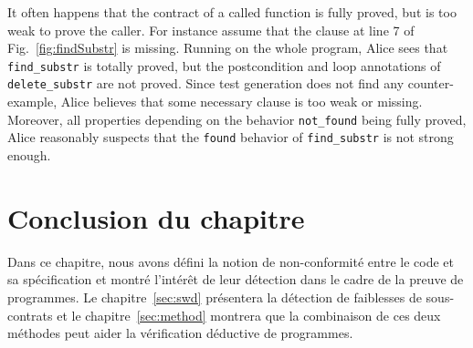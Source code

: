 It often happens that the contract of a called function is
fully proved, but is too weak to prove the caller.
For instance assume that the clause at line 7 of Fig.~\ref{fig:findSubstr} is
missing. Running \Wp on the whole program, Alice sees that
\lstinline{find_substr} is totally proved, but the postcondition and loop
annotations of \lstinline{delete_substr} are not proved. Since test generation
does not find any counter-example, Alice believes that some necessary clause is
too weak or missing.
Moreover, all properties depending on the behavior \lstinline{not_found} being
fully proved, Alice reasonably suspects that the \lstinline{found} behavior of
\lstinline{find_substr} is not strong enough.


\section*{Conclusion du chapitre}

Dans ce chapitre, nous avons défini la notion de non-conformité entre le code
et sa spécification et montré l'intérêt de leur détection dans le cadre de la
preuve de programmes.
Le chapitre~\ref{sec:swd} présentera la détection de faiblesses de sous-contrats
et le chapitre~\ref{sec:method} montrera que la combinaison de ces deux méthodes
peut aider la vérification déductive de programmes.
